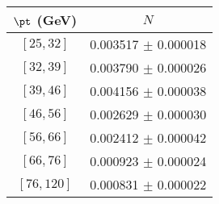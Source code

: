 \begin{tabular}{c||c}
$\pt$ (GeV) & $N$  \\
\hline
$[25, 32]$ & 0.003517 $\pm$ 0.000018\\
$[32, 39]$ & 0.003790 $\pm$ 0.000026\\
$[39, 46]$ & 0.004156 $\pm$ 0.000038\\
$[46, 56]$ & 0.002629 $\pm$ 0.000030\\
$[56, 66]$ & 0.002412 $\pm$ 0.000042\\
$[66, 76]$ & 0.000923 $\pm$ 0.000024\\
$[76, 120]$ & 0.000831 $\pm$ 0.000022\\
\end{tabular}
